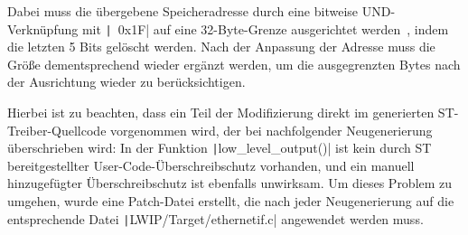Dabei muss die übergebene Speicheradresse durch eine bitweise UND-Verknüpfung
mit \texttt|~0x1F| auf eine 32-Byte-Grenze ausgerichtet
werden~\cite{CMSIS_Core_CacheFunctions}, indem die letzten 5 Bits gelöscht
werden. Nach der Anpassung der Adresse muss die Größe dementsprechend wieder
ergänzt werden, um die ausgegrenzten Bytes nach der Ausrichtung wieder zu
berücksichtigen.

Hierbei ist zu beachten, dass ein Teil der Modifizierung direkt im generierten
ST-Treiber-Quellcode vorgenommen wird, der bei nachfolgender Neugenerierung
überschrieben wird: In der Funktion \texttt|low_level_output()| ist
kein durch ST bereitgestellter User-Code-Überschreibschutz vorhanden, und ein
manuell hinzugefügter Überschreibschutz ist ebenfalls unwirksam. Um dieses
Problem zu umgehen, wurde eine Patch-Datei erstellt, die nach jeder
Neugenerierung auf die entsprechende Datei
\linebreak\texttt|LWIP/Target/ethernetif.c| angewendet werden muss.
